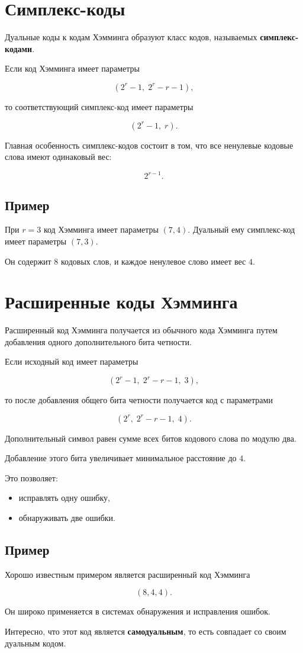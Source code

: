 \documentclass[a4paper,12pt]{article}
\begin{document}
\section{Симплекс-коды}

Дуальные коды к кодам Хэмминга образуют
класс кодов, называемых \textbf{симплекс-кодами}.

Если код Хэмминга имеет параметры

\[
(2^r - 1,\; 2^r - r - 1),
\]

то соответствующий симплекс-код имеет параметры

\[
(2^r - 1,\; r).
\]

Главная особенность симплекс-кодов состоит в том,
что все ненулевые кодовые слова имеют одинаковый вес:

\[
2^{r-1}.
\]

\subsection{Пример}

При $r = 3$ код Хэмминга имеет параметры $(7,4)$.
Дуальный ему симплекс-код имеет параметры $(7,3)$.

Он содержит $8$ кодовых слов,
и каждое ненулевое слово имеет вес $4$.

\section{Расширенные коды Хэмминга}

Расширенный код Хэмминга получается из обычного
кода Хэмминга путем добавления одного
дополнительного бита четности.

Если исходный код имеет параметры

\[
(2^r - 1,\; 2^r - r - 1,\; 3),
\]

то после добавления общего бита четности
получается код с параметрами

\[
(2^r,\; 2^r - r - 1,\; 4).
\]

Дополнительный символ равен сумме всех
битов кодового слова по модулю два.

Добавление этого бита увеличивает
минимальное расстояние до $4$.

Это позволяет:

\begin{itemize}
\item исправлять одну ошибку,
\item обнаруживать две ошибки.
\end{itemize}

\subsection{Пример}

Хорошо известным примером является
расширенный код Хэмминга

\[
(8,4,4).
\]

Он широко применяется в системах
обнаружения и исправления ошибок.

Интересно, что этот код является
\textbf{самодуальным}, то есть совпадает
со своим дуальным кодом.
\end{document}
